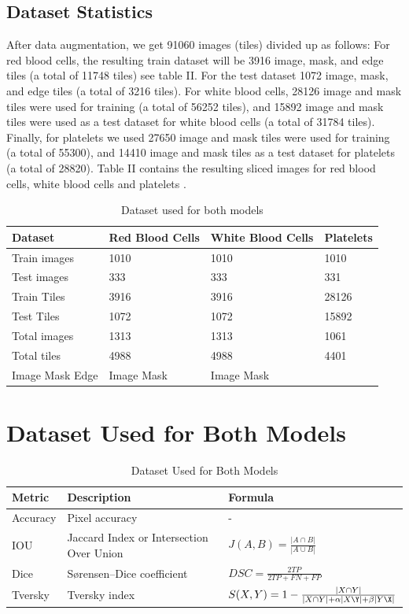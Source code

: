 \documentclass[conference]{IEEEtran}
\begin{document}
\subsection{Dataset Statistics}
After data augmentation, we get 91060 images (tiles) divided up as follows: For red blood cells, the resulting train dataset will be 3916 image, mask, and edge tiles (a total of 11748 tiles) see table II. For the test dataset 1072 image, mask, and edge tiles (a total of 3216 tiles). For white blood cells, 28126 image and mask tiles were used for training (a total of 56252 tiles), and 15892 image and mask tiles were used as a test dataset for white blood cells (a total of 31784 tiles). Finally, for platelets we used 27650 image and mask tiles were used for training (a total of 55300), and 14410 image and mask tiles as a test dataset for platelets (a total of 28820). Table II contains the resulting sliced images for red blood cells, white blood cells and platelets .
\begin{table}[htbp]
\centering
\caption{Dataset used for both models}
\label{tab:dataset}
\begin{tabular}{llll}
\hline
Dataset & Red Blood Cells & White Blood Cells & Platelets \\
\hline
Train images & 1010 & 1010 & 1010 \\
Test images & 333 & 333 & 331 \\
Train Tiles & 3916 & 3916 & 28126 \\
Test Tiles & 1072 & 1072 & 15892 \\
Total images & 1313 & 1313 & 1061 \\
Total tiles & 4988 & 4988 & 4401 \\
Image Mask Edge & Image Mask & Image Mask \\
\hline
\end{tabular}
\end{table}

\section{Dataset Used for Both Models}
\begin{table}[htbp]
\centering
\caption{Dataset Used for Both Models}
\label{tab:dataset}
\begin{tabular}{lll}
\hline
Metric & Description & Formula \\
\hline
Accuracy & Pixel accuracy & - \\
IOU & Jaccard Index or Intersection Over Union & $J(A, B) = \frac{|A \cap B|}{|A \cup B|}$ \\
Dice & Sørensen–Dice coefficient & $DSC = \frac{2TP}{2TP + FN + FP}$ \\
Tversky & Tversky index & $S(X, Y) = 1 - \frac{|X \cap Y|}{|X \cap Y| + \alpha|X\Y| + \beta|Y\X|}$ \\
\hline
\end{tabular}
\end{table}
\end{document}
